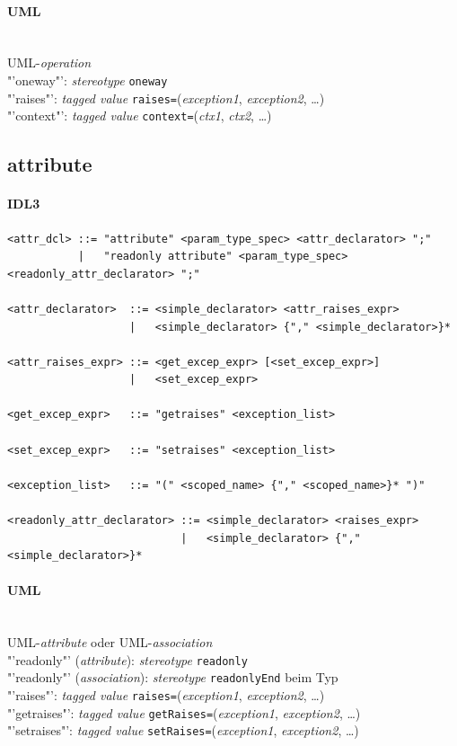 \documentclass [a4paper,10pt] {scrartcl}
\begin{document}
\paragraph{UML}~\\
UML-\emph{operation}\\
"'oneway"': \emph{stereotype} \texttt{oneway}\\
"'raises"': \emph{tagged value} \texttt{raises=}(\emph{exception1}, \emph{exception2}, \dots)\\
"'context"': \emph{tagged value} \texttt{context=}(\emph{ctx1}, \emph{ctx2}, \dots)

\cleardoublepage
\subsection{attribute}
\paragraph{IDL3}
\begin{verbatim}
<attr_dcl> ::= "attribute" <param_type_spec> <attr_declarator> ";"
           |   "readonly attribute" <param_type_spec> <readonly_attr_declarator> ";"

<attr_declarator>  ::= <simple_declarator> <attr_raises_expr>
                   |   <simple_declarator> {"," <simple_declarator>}*

<attr_raises_expr> ::= <get_excep_expr> [<set_excep_expr>]
                   |   <set_excep_expr>

<get_excep_expr>   ::= "getraises" <exception_list>

<set_excep_expr>   ::= "setraises" <exception_list>

<exception_list>   ::= "(" <scoped_name> {"," <scoped_name>}* ")"

<readonly_attr_declarator> ::= <simple_declarator> <raises_expr>
                           |   <simple_declarator> {"," <simple_declarator>}*
\end{verbatim}
\paragraph{UML}~\\
UML-\emph{attribute} oder UML-\emph{association}\\
"'readonly"' (\emph{attribute}): \emph{stereotype} \texttt{readonly}\\
"'readonly"' (\emph{association}): \emph{stereotype} \texttt{readonlyEnd} beim Typ\\
"'raises"': \emph{tagged value} \texttt{raises=}(\emph{exception1}, \emph{exception2}, \dots)\\
"'getraises"': \emph{tagged value} \texttt{getRaises=}(\emph{exception1}, \emph{exception2}, \dots)\\
"'setraises"': \emph{tagged value} \texttt{setRaises=}(\emph{exception1}, \emph{exception2}, \dots)\\
\end{document}
